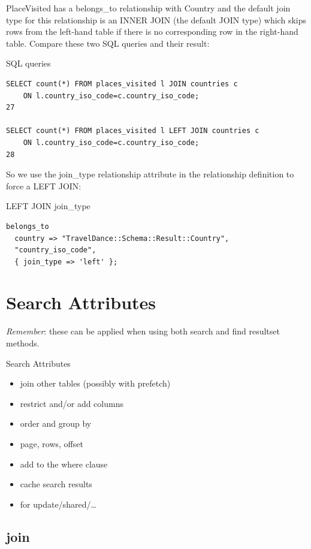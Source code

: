 PlaceVisited has a belongs\_to relationship with Country and the default join
type for this relationship is an INNER JOIN (the default JOIN type) which
skips rows from the left-hand table if there is no corresponding row in the
right-hand table. Compare these two SQL queries and their result: 

\begin{frame}[fragile]{SQL queries}
\begin{lstlisting}
SELECT count(*) FROM places_visited l JOIN countries c
    ON l.country_iso_code=c.country_iso_code;
27

SELECT count(*) FROM places_visited l LEFT JOIN countries c
    ON l.country_iso_code=c.country_iso_code;
28
\end{lstlisting}
\end{frame}

So we use the join\_type relationship attribute in the relationship definition to force a LEFT JOIN:

\begin{frame}[fragile]{LEFT JOIN join\_type}
\begin{lstlisting}
belongs_to
  country => "TravelDance::Schema::Result::Country",
  "country_iso_code",
  { join_type => 'left' };
\end{lstlisting}
\end{frame}

\section{Search Attributes}

\emph{Remember}: these can be applied when using both search and find resultset
methods.

\begin{frame}{Search Attributes}
\begin{itemize}
\item join other tables (possibly with prefetch)
\item restrict and/or add columns
\item order and group by
\item page, rows, offset
\item add to the where clause
\item cache search results
\item for update/shared/…
\end{itemize}
\end{frame}

\subsection{join}

